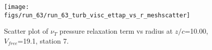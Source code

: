 \begin{figure}[H]
\centering
\texttt{[image: figs/run\_63/run\_63\_turb\_visc\_ettap\_vs\_r\_meshscatter]}
\caption{Scatter plot of $\nu_T$ pressure relaxation term vs radius at $z/c$=10.00, $V_{free}$=19.1, station 7.}
\label{fig:run_63_turb_visc_ettap_vs_r_meshscatter}
\end{figure}


